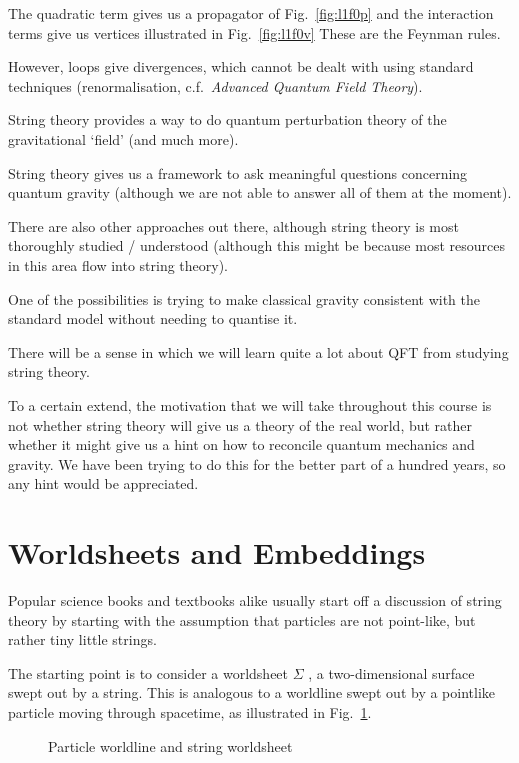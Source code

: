 The quadratic term gives us a propagator of Fig.~\ref{fig:l1f0p}
and the interaction terms give us vertices illustrated in Fig.~\ref{fig:l1f0v}
These are the Feynman rules.

However, loops give divergences, which cannot be dealt with using standard techniques (renormalisation, c.f.~\emph{Advanced Quantum Field Theory}).

String theory provides a way to do quantum perturbation theory of the gravitational `field' (and much more).

String theory gives us a framework to ask meaningful questions concerning quantum gravity (although we are not able to answer all of them at the moment).

There are also other approaches out there, although string theory is most thoroughly studied / understood (although this might be because most resources in this area flow into string theory).

One of the possibilities is trying to make classical gravity consistent with the standard model without needing to quantise it.

There will be a sense in which we will learn quite a lot about QFT from studying string theory.

To a certain extend, the motivation that we will take throughout this course is not whether string theory will give us a theory of the real world, but rather whether it might give us a hint on how to reconcile quantum mechanics and gravity. We have been trying to do this for the better part of a hundred years, so any hint would be appreciated.

\section{Worldsheets and Embeddings}%
\label{sec:worldsheets_and_embeddings}

Popular science books and textbooks alike usually start off a discussion of string theory by starting with the assumption that particles are not point-like, but rather tiny little strings.

The starting point is to consider a worldsheet $\Sigma$ , a two-dimensional surface swept out by a string. This is analogous to a worldline swept out by a pointlike particle moving through spacetime, as illustrated in Fig.~\ref{fig:l1f1}.
\begin{figure}[tbhp]
  \centering
  \def\svgwidth{0.6\columnwidth}
  
  \caption{Particle worldline and string worldsheet}
  \label{fig:l1f1}
\end{figure}

